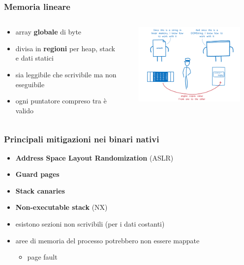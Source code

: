 \documentclass{beamer}
\begin{document}
\begin{frame}
  \frametitle{Memoria lineare}
  \begin{columns}
    \begin{column}{0.6\textwidth}
      \begin{itemize}
        \item array \textbf{globale} di byte
        \pause
        \item divisa in \textbf{regioni} per heap, stack e dati statici
        \pause
        \item sia leggibile che scrivibile ma non eseguibile 
        \pause
        \item ogni puntatore compreso tra  è valido 
      \end{itemize}
    \end{column}
    \begin{column}{0.4\textwidth}
      \centerline{\includegraphics[width=9cm,height=4cm,keepaspectratio]{images/memman.png}}
    \end{column}
  \end{columns}
\end{frame}

\begin{frame}
  \frametitle{Principali mitigazioni nei binari nativi}
      \begin{itemize}
        \item \textbf{Address Space Layout Randomization} (ASLR)     
        \pause
        \item \textbf{Guard pages}   
        \pause
        \item \textbf{Stack canaries}
        \pause 
        \item \textbf{Non-executable stack} (NX)
    \pause 
    \item esistono sezioni non scrivibili (per i dati costanti)
    \pause
    \item aree di memoria del processo potrebbero non essere mappate
      \begin{itemize}
        \item page fault
      \end{itemize}
  \end{itemize}
\end{frame}
\end{document}
